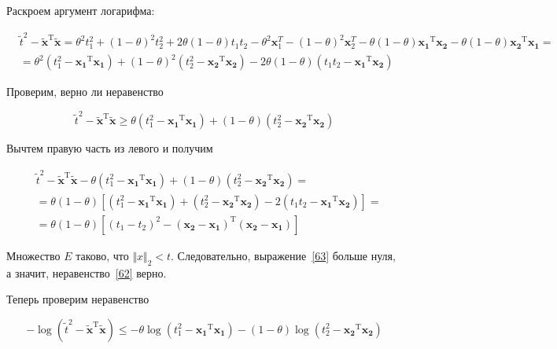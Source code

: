 	Раскроем аргумент логарифма:
	
	\begin{equation}
	\begin{split}
	&\tilde{t}^2 - \mathbf{\tilde{x}}^\text{T} \mathbf{\tilde{x}} = \theta^2 t_1^2
	+ (1-\theta)^2 t_2^2 + 2\theta(1-\theta)t_1 t_2 - \theta^2 \mathbf{x}_1^{T} -(1-
	\theta)^2 \mathbf{x}_2^{T} - \theta (1- \theta)\mathbf{x_1}^\text{T}
	\mathbf{x_2} - \theta (1- \theta)\mathbf{x_2}^\text{T} \mathbf{x_1} = \\
	&=\theta^2(t_1^2 - \mathbf{x_1}^\text{T} \mathbf{x_1}) + (1-\theta)^2(t_2^2 -
	\mathbf{x_2}^\text{T} \mathbf{x_2}) - 2\theta (1-\theta)(t_1 t_2 -
	\mathbf{x_1}^\text{T} \mathbf{x_2})
	\end{split}
	\end{equation}
	
	Проверим, верно ли неравенство
	
	\begin{equation}
	\label{62}
	\tilde{t}^2 - \mathbf{\tilde{x}}^\text{T} \mathbf{\tilde{x}} \geqslant \theta
	(t_1^2 - \mathbf{x_1}^\text{T} \mathbf{x_1}) + (1-\theta)(t_2^2 -
	\mathbf{x_2}^\text{T} \mathbf{x_2})
	\end{equation}
	
	Вычтем правую часть из левого и получим
	
	
	
	\begin{equation}
	\begin{split}
	\label{63}
	&\tilde{t}^2 - \mathbf{\tilde{x}}^\text{T} \mathbf{\tilde{x}} - \theta (t_1^2 -
	\mathbf{x_1}^\text{T} \mathbf{x_1}) + (1-\theta)(t_2^2 - \mathbf{x_2}^\text{T}
	\mathbf{x_2}) = \\
	&= \theta(1-\theta) \left[ (t_1^2 - \mathbf{x_1}^\text{T} \mathbf{x_1}) +
	(t_2^2 - \mathbf{x_2}^\text{T} \mathbf{x_2}) - 2(t_1 t_2 - \mathbf{x_1}^\text{T}
	\mathbf{x_2})\right] = \\
	&=\theta(1-\theta) \left[ (t_1-t_2)^2 - (\mathbf{x_2} -
	\mathbf{x_1})^\text{T}(\mathbf{x_2} - \mathbf{x_1})\right] 
	\end{split}
	\end{equation}
	
	Множество $E$ таково, что $\Vert x \Vert_2 < t$. Следовательно,
	выражение~\eqref{63} больше нуля, а значит, неравенство~\eqref{62} верно.
	
	Теперь проверим неравенство
	
	\begin{equation}
	\label{64}
	-\log(\tilde{t}^2 - \mathbf{\tilde{x}}^\text{T} \mathbf{\tilde{x}}) \leqslant -
	\theta \log(t_1^2 - \mathbf{x_1}^\text{T} \mathbf{x_1}) - (1-\theta) \log(t_2^2
	- \mathbf{x_2}^\text{T} \mathbf{x_2})
	\end{equation}
	
